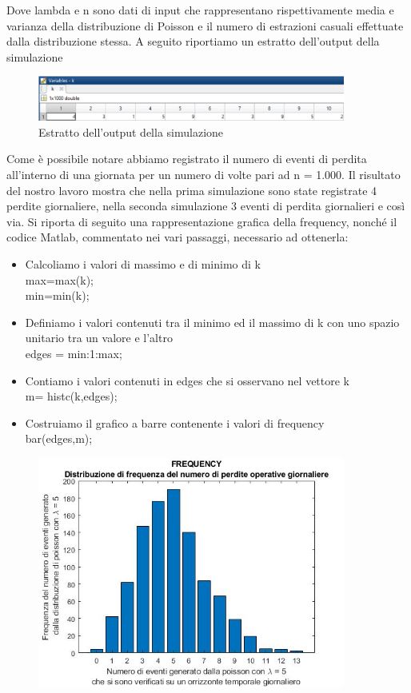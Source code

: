 \documentclass[titlepage]{article}
\begin{document}
\begin{itemize}
Dove lambda e n sono dati di input che rappresentano rispettivamente media e varianza della distribuzione di Poisson e il numero di estrazioni casuali effettuate dalla distribuzione stessa.
A seguito riportiamo un estratto dell’output della simulazione  
\begin{figure}[htbp]
	\includegraphics[width=0.9\textwidth]{numeroeventi.png}
	\caption{\label{fig:numeroeventi.png}Estratto dell'output della simulazione }
\end{figure}
Come è possibile notare abbiamo registrato il numero di eventi di perdita all’interno di una giornata per un numero di volte pari ad n = 1.000. Il risultato del nostro lavoro mostra che nella prima simulazione sono state registrate 4 perdite giornaliere, nella seconda simulazione 3 eventi di perdita giornalieri e così via. Si riporta di seguito una rappresentazione grafica della frequency, nonché il codice Matlab, commentato nei vari passaggi, necessario ad ottenerla:
\\
\begin{itemize}
\item	Calcoliamo i valori di massimo e di minimo di k
\\
max=max(k);
\\
min=min(k);
\\
\item	Definiamo i valori contenuti tra il minimo ed il massimo di k con uno spazio unitario tra un valore e l'altro
\\
edges = min:1:max;
\\
\item	Contiamo i valori contenuti in edges che si osservano nel vettore k \\
m= histc(k,edges);
\\
\item Costruiamo il grafico a barre contenente i valori di frequency
\\
bar(edges,m);
\\
\end{itemize}
\begin{figure}[htbp]
	\centering
	\includegraphics[width=0.9\textwidth]{FREQUENCY.jpg}

\end{figure}
\end{itemize}
\end{document}
